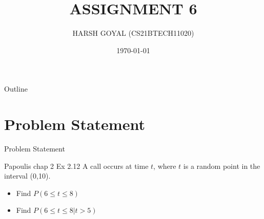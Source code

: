 \documentclass{beamer}
\title{ASSIGNMENT 6}
\author{HARSH GOYAL (CS21BTECH11020)}
\date{\today}
\begin{document}
\begin{frame}
    \titlepage 
\end{frame}

\logo{}


\begin{frame}{Outline}
    \tableofcontents
\end{frame}


\section{Problem Statement}
\begin{frame}{Problem Statement}
    \begin{block}{Papoulis chap 2 Ex 2.12}
        A call occurs at time $t$, where $t$ is a random point in the interval (0,10).
        \begin{itemize}
            \item Find $P(6 \leq t \leq 8)$
            \item Find $P(6 \leq t \leq 8 | t > 5 )$
        \end{itemize}
              
    \end{block}

\end{frame}


\end{document}
